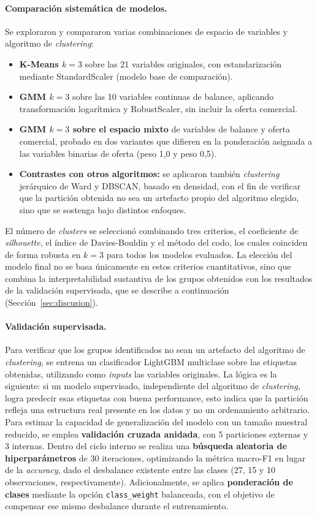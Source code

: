 \documentclass[11pt,a4paper]{article}
\begin{document}
\paragraph{Comparación sistemática de modelos.} Se exploraron y compararon varias combinaciones de
espacio de variables y algoritmo de \textit{clustering}:
\begin{itemize}
  \item \textbf{K-Means $k=3$} sobre las 21 variables originales, con estandarización mediante
  StandardScaler (modelo base de comparación).
  \item \textbf{GMM $k=3$} sobre las 10 variables continuas de balance, aplicando transformación
  logarítmica y RobustScaler, sin incluir la oferta comercial.
  \item \textbf{GMM $k=3$ sobre el espacio mixto} de variables de balance y oferta comercial, probado
  en dos variantes que difieren en la ponderación asignada a las variables binarias de oferta
  (peso 1,0 y peso 0,5).
  \item \textbf{Contrastes con otros algoritmos:} se aplicaron también \textit{clustering} jerárquico
  de Ward y DBSCAN, basado en densidad, con el fin de verificar que la partición obtenida no sea un
  artefacto propio del algoritmo elegido, sino que se sostenga bajo distintos enfoques.
\end{itemize}
El número de \textit{clusters} se seleccionó combinando tres criterios, el coeficiente de
\textit{silhouette}, el índice de Davies-Bouldin y el método del codo, los cuales coinciden de forma
robusta en $k=3$ para todos los modelos evaluados. La elección del modelo final no se basa únicamente
en estos criterios cuantitativos, sino que combina la interpretabilidad sustantiva de los grupos
obtenidos con los resultados de la validación supervisada, que se describe a continuación
(Sección~\ref{sec:discusion}).

\paragraph{Validación supervisada.} Para verificar que los grupos identificados no sean un artefacto
del algoritmo de \textit{clustering}, se entrena un clasificador LightGBM multiclase sobre las
etiquetas obtenidas, utilizando como \textit{inputs} las variables originales. La lógica es la
siguiente: si un modelo supervisado, independiente del algoritmo de \textit{clustering}, logra
predecir esas etiquetas con buena performance, esto indica que la partición refleja una estructura
real presente en los datos y no un ordenamiento arbitrario. Para estimar la capacidad de
generalización del modelo con un tamaño muestral reducido, se emplea \textbf{validación cruzada
anidada}, con 5 particiones externas y 3 internas. Dentro del ciclo interno se realiza una
\textbf{búsqueda aleatoria de hiperparámetros} de 30 iteraciones, optimizando la métrica macro-F1 en
lugar de la \textit{accuracy}, dado el desbalance existente entre las clases (27, 15 y 10 observaciones,
respectivamente). Adicionalmente, se aplica \textbf{ponderación de clases} mediante la opción
\texttt{class\_weight} balanceada, con el objetivo de compensar ese mismo desbalance durante el
entrenamiento.
\end{document}
